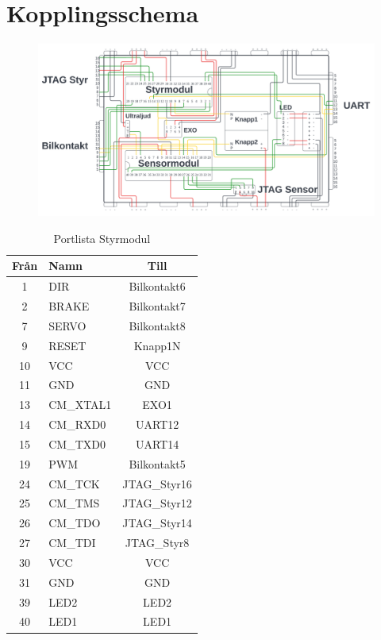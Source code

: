 \documentclass[10pt,oneside,swedish]{lips}
\begin{document}
\section{Kopplingsschema}
\begin{figure}[htbp]
  \centering
  \includegraphics[width=1\textwidth]{Figures/Virning.png}
  \label{fig:virning.png}
\end{figure}

\begin{longtable}{|c|p{17mm}|c|}
    \caption{Portlista Styrmodul}
    \hline
    Från & Namn &  Till\\
    \hline \hline
    1 & DIR &  Bilkontakt6\\
    \hline
    2 & BRAKE & Bilkontakt7\\
    \hline
    7 & SERVO & Bilkontakt8\\
    \hline
    9 & RESET & Knapp1N\\
    \hline
    10 & VCC & VCC\\
    \hline
    11 & GND & GND\\
    \hline
    13 & CM\_XTAL1 & EXO1\\
    \hline
    14 & CM\_RXD0 & UART12\\
    \hline
    15 & CM\_TXD0 & UART14\\
    \hline
    19 & PWM & Bilkontakt5\\
    \hline
    24 & CM\_TCK & JTAG\_Styr16\\
    \hline
    25 & CM\_TMS & JTAG\_Styr12\\
    \hline
    26 & CM\_TDO & JTAG\_Styr14\\
    \hline
    27 & CM\_TDI & JTAG\_Styr8\\
    \hline
    30 & VCC & VCC\\
    \hline
    31 & GND & GND\\
    \hline
    39 & LED2 & LED2\\
    \hline
    40 & LED1 & LED1\\
    \hline
\end{longtable}
\end{document}
